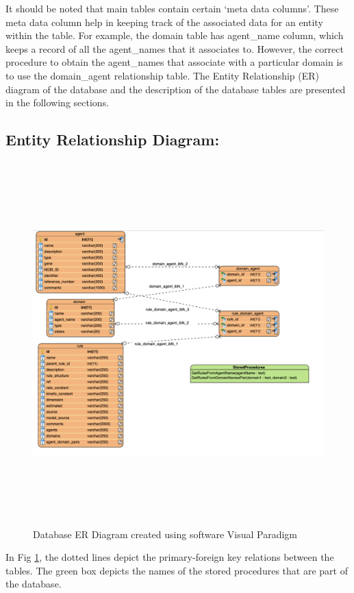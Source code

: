 \documentclass[msc,deptreport,ai]{infthesis}      %
\begin{document}
 It should be noted that main tables contain certain `meta data columns'. These meta data column help in keeping track of the associated data for an entity within the table. For example, the domain table has agent\_name column, which keeps a record of all the agent\_names that it associates to. However, the correct procedure to obtain the agent\_names that associate with a particular domain is to use the domain\_agent relationship table. The Entity Relationship (ER) diagram of the database and the description of the database tables are presented in the following sections.
  \subsection{Entity Relationship Diagram:}
  \begin{figure}[H]
  	\centering
  	\captionsetup{justification=centering}
  	\includegraphics[width=\linewidth,height=14cm,keepaspectratio]{er.png}	
  	\caption{Database ER Diagram created using software Visual Paradigm \cite{vd}}
  	\label{fig:er}		
  \end{figure}
  In Fig \ref{fig:er}, the dotted lines depict the primary-foreign key relations between the tables. The green box depicts the names of the stored procedures that are part of the database.
\end{document}
